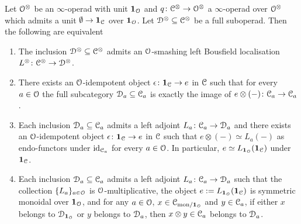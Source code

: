 \begin{proposition}
\label{proposition:equivalent-1}%
Let $\mathcal{O}^{\otimes}$ be an $\infty$-operad with unit $\mathbf{1}_{\mathcal{O}}$
and $q\colon \mathcal C^{\otimes} \to \mathcal{O}^{\otimes}$ a $\infty$-operad over $\mathcal{O}^{\otimes}$ which admits a unit $\emptyset \to \mathbf{1}_{\mathcal C}$ over $\mathbf{1}_{\mathcal{O}}$. Let $\mathcal{D}^{\otimes} \subseteq \mathcal C^{\otimes}$ be a full suboperad.
Then the following are equivalent
\begin{enumerate}
\item
\label{item:smashing}%
The inclusion $\mathcal{D}^{\otimes} \subseteq \mathcal C^{\otimes}$ admits an $\mathcal{O}$-smashing left Bousfield localisation $L^{\otimes}\colon \mathcal C^{\otimes} \to \mathcal{D}^{\otimes}$. %
\item
\label{item:idem-1}%
There exists an $\mathcal{O}$-idempotent object $\epsilon\colon \mathbf{1}_{\mathcal C} \to e$ in $\mathcal C$ such that for every $a \in \mathcal{O}$ the full subcategory $\mathcal{D}_a \subseteq \mathcal C_a$ is exactly the image of $e \otimes (-)\colon \mathcal C_a \to \mathcal C_a$. 
\item
\label{item:idem-2}%
Each inclusion $\mathcal{D}_a \subseteq \mathcal C_a$ admits a left adjoint $L_a\colon \mathcal C_a \to \mathcal{D}_a$
and there exists an $\mathcal{O}$-idempotent object $\epsilon\colon\mathbf{1}_{\mathcal C} \to e$ in $\mathcal C$ such that $e \otimes (-) \simeq L_a(-)$ as endo-functors under $\mathrm{id}_{\mathcal C_a}$ for every $a \in \mathcal{O}$. In particular, %
$e \simeq L_{\mathbf{1}_{\mathcal{O}}}(\mathbf{1}_{\mathcal C})$ under $\mathbf{1}_{\mathcal C}$. %
\item
\label{item:closed}%
Each inclusion $\mathcal{D}_a \subseteq \mathcal C_a$ admits a left adjoint $L_a\colon \mathcal C_a \to \mathcal{D}_a$
such that the collection $\{L_a\}_{a \in \mathcal{O}}$ is $\mathcal{O}$-multiplicative, the object $e := L_{\mathbf{1}_{\mathcal{O}}}(\mathbf{1}_{\mathcal C})$ is symmetric monoidal over $\mathbf{1}_{\mathcal{O}}$,
and for any $a \in \mathcal{O}$, $x \in \mathcal C_{\mathrm{mon}/\mathbf{1}_{\mathcal{O}}}$ and $y \in \mathcal C_a$, if either $x$ belongs to $\mathcal{D}_{\mathbf{1}_{\mathcal{O}}}$ or $y$ belongs to $\mathcal{D}_{a}$, then $x \otimes y \in \mathcal C_a$ belongs to $\mathcal{D}_a$. 
\end{enumerate}
\end{proposition}

